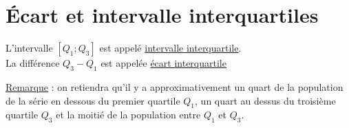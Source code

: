 \documentclass[french]{book}
\begin{document}
\section{Écart et intervalle interquartiles}

\begin{defn}
L'intervalle $[Q_1;Q_3]$ est appelé \underline{intervalle interquartile}.\\
La différence $Q_3-Q_1$ est appelée \underline{écart interquartile}
\end{defn}

\underline{Remarque} : on retiendra qu'il y a approximativement un quart de la population de la série en dessous du premier quartile $Q_1$, un quart au dessus du troisième quartile $Q_3$ et la moitié de la population entre $Q_1$ et $Q_3$. 
\end{document}
